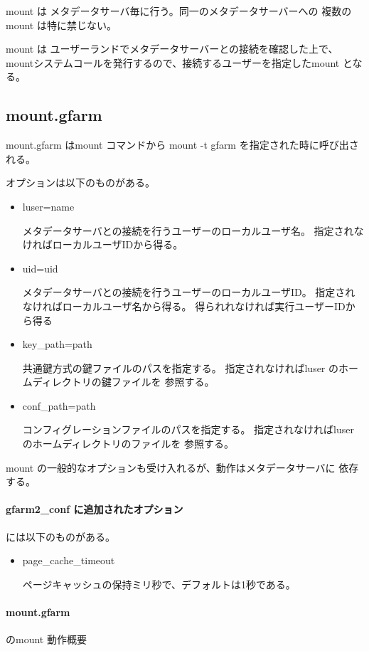 mount は メタデータサーバ毎に行う。同一のメタデータサーバーへの
複数のmount は特に禁じない。

mount は ユーザーランドでメタデータサーバーとの接続を確認した上で、
mountシステムコールを発行するので、接続するユーザーを指定したmount となる。

\subsection{mount.gfarm}
	mount.gfarm はmount コマンドから
	mount -t gfarm を指定された時に呼び出される。

	オプションは以下のものがある。
	\begin{itemize}
	\item	luser=name	\par
		メタデータサーバとの接続を行うユーザーのローカルユーザ名。
		指定されなければローカルユーザIDから得る。
	\item	uid=uid	\par
		メタデータサーバとの接続を行うユーザーのローカルユーザID。
		指定されなければローカルユーザ名から得る。
		得られれなければ実行ユーザーIDから得る
	\item	key_path=path	\par
		共通鍵方式の鍵ファイルのパスを指定する。
		指定されなければluser のホームディレクトリの鍵ファイルを
		参照する。
	\item	conf_path=path	\par
		コンフィグレーションファイルのパスを指定する。
		指定されなければluser のホームディレクトリのファイルを
		参照する。
	\end{itemize}

	mount の一般的なオプションも受け入れるが、動作はメタデータサーバに
	依存する。

\paragraph{gfarm2_conf に追加されたオプション} には以下のものがある。
	\begin{itemize}
	\item	page_cache_timeout	\par
		ページキャッシュの保持ミリ秒で、デフォルトは1秒である。
	\end{itemize}

\paragraph{mount.gfarm} のmount 動作概要

